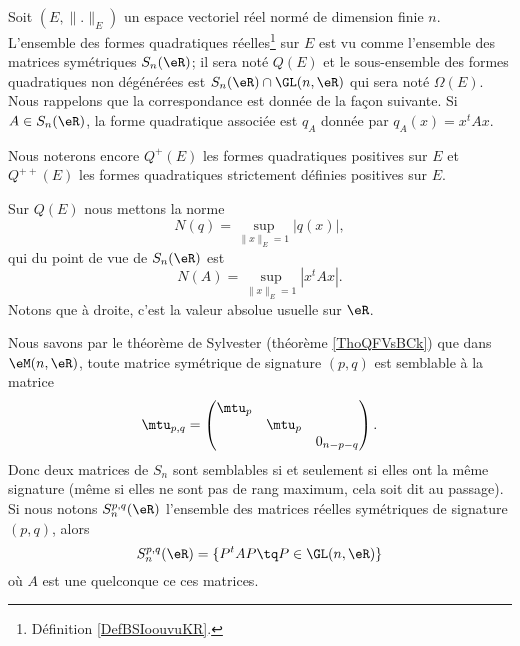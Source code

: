 Soit \( (E,\| . \|_E)\) un espace vectoriel réel normé de dimension finie \( n\). L'ensemble des formes quadratiques réelles\footnote{Définition \ref{DefBSIoouvuKR}.} sur \( E\) est vu comme l'ensemble des matrices symétriques \( S_n(\eR)\); il sera noté \( Q(E)\) et le sous-ensemble des formes quadratiques non dégénérées est \( S_n(\eR)\cap\GL(n,\eR)\) qui sera noté \( \Omega(E)\). Nous rappelons que la correspondance est donnée de la façon suivante. Si \( A\in S_n(\eR)\), la forme quadratique associée est \( q_A\) donnée par \( q_A(x)=x^tAx\).

Nous noterons encore \( Q^+(E)\) les formes quadratiques positives sur \( E\) et \( Q^{++}(E)\) les formes quadratiques strictement définies positives sur \( E\).

Sur \( Q(E)\) nous mettons la norme
\begin{equation}
    N(q)=\sup_{\| x \|_E=1}| q(x) |,
\end{equation}
qui du point de vue de \( S_n(\eR)\) est
\begin{equation}    \label{EqDOgBNAg}
    N(A)=\sup_{\| x \|_E=1}| x^tAx |.
\end{equation}
Notons que à droite, c'est la valeur absolue usuelle sur \( \eR\).

Nous savons par le théorème de Sylvester (théorème \ref{ThoQFVsBCk}) que dans \( \eM(n,\eR)\), toute matrice symétrique de signature \( (p,q)\) est semblable à la matrice
\begin{equation}
    \mtu_{p,q}=\begin{pmatrix}
        \mtu_p    &       &       \\
        &   \mtu_{p}    &       \\
        &       &   0_{n-p-q}
    \end{pmatrix}.
\end{equation}
Donc deux matrices de \( S_n\) sont semblables si et seulement si elles ont la même signature (même si elles ne sont pas de rang maximum, cela soit dit au passage). Si nous notons \( S_n^{p,q}(\eR)\) l'ensemble des matrices réelles symétriques de signature \( (p,q)\), alors
\begin{equation}
    S_n^{p,q}(\eR)=\{ P^tAP\tq P\in \GL(n,\eR) \}
\end{equation}
où \( A\) est une quelconque ce ces matrices.


